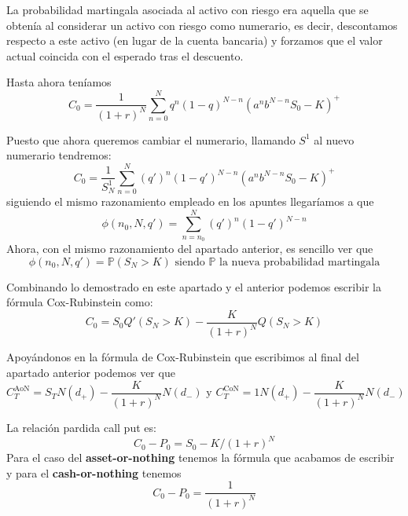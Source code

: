 \begin{problem}[1]
\spart

La probabilidad martingala asociada al activo con riesgo era aquella que se obtenía al considerar un activo con riesgo como numerario, es decir, descontamos respecto a este activo (en lugar de la cuenta bancaria) y forzamos que el valor actual coincida con el esperado tras el descuento.

Hasta ahora teníamos
\[C_0 = \frac{1}{(1+r)^N}\sum_{n=0}^Nq^n(1-q)^{N-n}(a^nb^{N-n}S_0-K)^+\]

Puesto que ahora queremos cambiar el numerario, llamando $S^1$ al nuevo numerario tendremos:
\[C_0 = \frac{1}{S^1_N}\sum_{n=0}^N(q')^n(1-q')^{N-n}(a^nb^{N-n}S_0-K)^+\]
siguiendo el mismo razonamiento empleado en los apuntes llegaríamos a que
\[\phi(n_0,N,q') = \sum_{n=n_0}^N(q')^n(1-q')^{N-n}\]
Ahora, con el mismo razonamiento del apartado anterior, es sencillo ver que
\[\phi(n_0,N,q') = \mathbb{P}(S_N>K) \text{ siendo } \mathbb{P} \text{ la nueva probabilidad martingala}\]

Combinando lo demostrado en este apartado y el anterior podemos escribir la fórmula Cox-Rubinstein como:
\[C_0=S_0Q'(S_N>K) - \frac{K}{(1+r)^N}Q(S_N>K)\]

\spart

Apoyándonos en la fórmula de Cox-Rubinstein que escribimos al final del apartado anterior podemos ver que
\[C_T^{\text{AoN}}=S_TN(d_+)-\frac{K}{(1+r)^N}N(d_-) \text{ y } C_T^{\text{CoN}}=1N(d_+)-\frac{K}{(1+r)^N}N(d_-)\]

\spart

La relación pardida call put es:
\[C_0-P_0=S_0-K/(1+r)^N\]
Para el caso del \textbf{asset-or-nothing} tenemos la fórmula que acabamos de escribir y para el \textbf{cash-or-nothing} tenemos
\[C_0-P_0=\frac{1}{(1+r)^N}\]

\end{problem}

